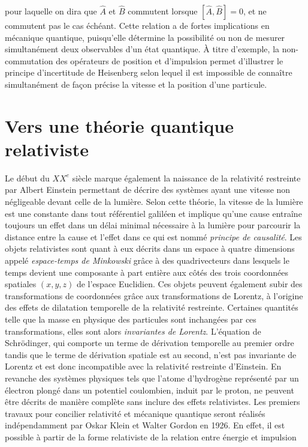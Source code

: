         pour laquelle on dira que $\hat{A}$ et $\hat{B}$ commutent lorsque $[\hat{A},\hat{B}]=0$, et ne commutent pas le cas échéant. Cette relation a de fortes implications en mécanique quantique, puisqu'elle détermine la possibilité ou non de mesurer simultanément deux observables d'un état quantique. À titre d'exemple, la non-commutation des opérateurs de position et d'impulsion permet d'illustrer le principe d'incertitude de Heisenberg selon lequel il est impossible de connaître simultanément de façon précise la vitesse et la position d'une particule. 
    
        \section{Vers une théorie quantique relativiste}
        \label{verslarelat}
        
         Le début du $XX^e$ siècle marque également la naissance de la relativité restreinte par Albert Einstein permettant de décrire des systèmes ayant une vitesse non négligeable devant celle de la lumière. Selon cette théorie, la vitesse de la lumière est une constante dans tout référentiel galiléen et implique qu'une cause entraîne toujours un effet dans un délai minimal nécessaire à la lumière pour parcourir la distance entre la cause et l'effet dans ce qui est nommé \textit{principe de causalité}. Les objets relativistes sont quant à eux décrits dans un espace à quatre dimensions appelé \textit{espace-temps de Minkowski} grâce à des quadrivecteurs dans lesquels le temps devient une composante à part entière aux côtés des trois coordonnées spatiales $(x,y,z)$ de l'espace Euclidien. Ces objets peuvent également subir des transformations de coordonnées grâce aux transformations de Lorentz, à l'origine des effets de dilatation temporelle de la relativité restreinte. Certaines quantités telle que la masse en physique des particules sont inchangées par ces transformations, elles sont alors \textit{invariantes de Lorentz}. L'équation de Schrödinger, qui comporte un terme de dérivation temporelle au premier ordre tandis que le terme de dérivation spatiale est au second, n'est pas invariante de Lorentz et est donc incompatible avec la relativité restreinte d'Einstein. En revanche des systèmes physiques tels que l'atome d'hydrogène représenté par un électron plongé dans un potentiel coulombien, induit par le proton, ne peuvent être décrits de manière complète sans inclure des effets relativistes. Les premiers travaux pour concilier relativité et mécanique quantique seront réalisés indépendamment par Oskar Klein et Walter Gordon en 1926. En effet, il est possible à partir de la forme relativiste de la relation entre énergie et impulsion 
        
